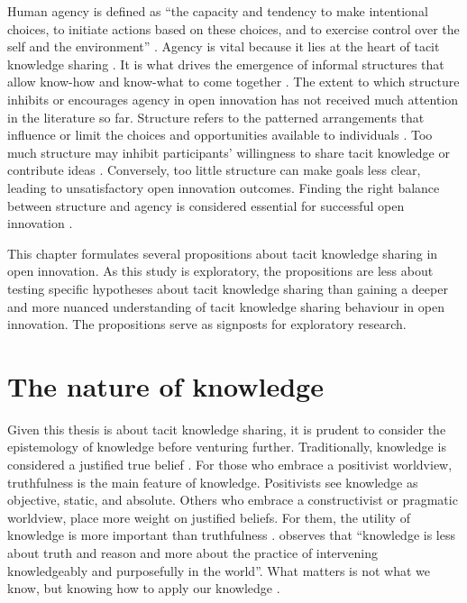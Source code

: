 Human agency is defined as \enquote{the capacity and tendency to make intentional choices, to initiate actions based on these choices, and to exercise control over the self and the environment} \citep[][pg. 88]{goller2017human}. Agency is vital because it lies at the heart of tacit knowledge sharing \citep{polanyi1966tacit}. It is what drives the emergence of informal structures that allow know-how and know-what to come together \citep{lam2014tacit, hubrich2015embodiment}. The extent to which structure inhibits or encourages agency in open innovation has not received much attention in the literature so far. Structure refers to the patterned arrangements that influence or limit the choices and opportunities available to individuals \citep{bandura1999social}. Too much structure may inhibit participants' willingness to share tacit knowledge or contribute ideas \citep{lam2000tacit}. Conversely, too little structure can make goals less clear, leading to unsatisfactory open innovation outcomes. Finding the right balance between structure and agency is considered essential for successful open innovation \citep{davis2010agency}. \medskip

This chapter formulates several propositions about tacit knowledge sharing in open innovation. As this study is exploratory, the propositions are less about testing specific hypotheses about tacit knowledge sharing than gaining a deeper and more nuanced understanding of tacit knowledge sharing behaviour in open innovation. The propositions serve as signposts for exploratory research.

\section{The nature of knowledge}

Given this thesis is about tacit knowledge sharing, it is prudent to consider the epistemology of knowledge before venturing further. Traditionally, knowledge is considered a justified true belief \citep{bolisani2018elusive}. For those who embrace a positivist worldview, truthfulness is the main feature of knowledge. Positivists see knowledge as objective, static, and absolute. Others who embrace a constructivist or pragmatic worldview, place more weight on justified beliefs. For them, the utility of knowledge is more important than truthfulness \citep{bolisani2018elusive}. \citet{spender1996organizational} observes that \enquote{knowledge is less about truth and reason and more about the practice of intervening knowledgeably and purposefully in the world}. What matters is not what we know, but knowing how to apply our knowledge \citep{ryle2009concept,orlikowski2002knowing}. \medskip

